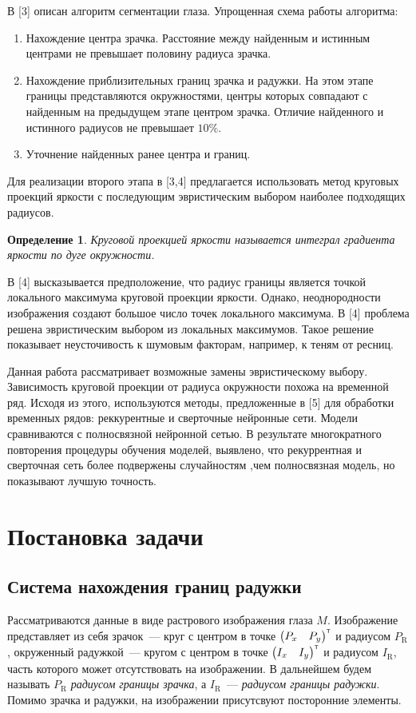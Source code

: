 \documentclass[12pt, twoside]{article}
\newtheorem{definition}{Определение}
\begin{document}
В [3] описан алгоритм сегментации глаза. Упрощенная схема работы алгоритма:
\begin{enumerate}
	\item Нахождение центра зрачка.
	 Расстояние между найденным и истинным центрами не превышает половину радиуса зрачка.
	\item Нахождение приблизительных границ зрачка и радужки.
	На этом этапе границы представляются окружностями, центры которых совпадают с найденным на предыдущем этапе центром зрачка. Отличие найденного и истинного радиусов не превышает $10\%$.
	
	\item Уточнение найденных ранее центра и границ.
\end{enumerate}
Для реализации второго этапа в [3,4] предлагается использовать метод круговых проекций яркости с последующим эвристическим выбором наиболее подходящих радиусов.
\begin{definition}\label{def:proj}
\emph{Круговой проекцией яркости} называется интеграл градиента яркости по дуге окружности.
\end{definition}
В [4] высказывается предположение, что радиус границы является точкой локального максимума круговой проекции яркости. Однако, неоднородности изображения создают большое число точек локального максимума. В [4] проблема решена эвристическим выбором из локальных максимумов. Такое решение показывает неусточивость к шумовым факторам, например, к теням от ресниц.

Данная работа рассматривает возможные замены эвристическому выбору. Зависимость круговой проекции от радиуса окружности похожа на временной ряд. Исходя из этого, используются методы, предложенные в [5] для обработки временных рядов: реккурентные и сверточные нейронные сети. Модели сравниваются с полносвязной нейронной сетью. В результате многократного повторения процедуры обучения моделей, выявлено, что рекуррентная и сверточная сеть более подвержены случайностям ,чем полносвязная модель, но показывают лучшую точность.

\section{Постановка задачи}
\subsection{Система нахождения границ радужки}

Рассматриваются данные в виде растрового изображения глаза $M$. Изображение представляет из себя зрачок~--- круг с центром в точке $\begin{pmatrix}P_x & P_y\end{pmatrix}^{\text{\tiny\sffamily\upshape\mdseries T}}$ и радиусом $P_\text{R}$, окруженный радужкой~--- кругом с центром в точке $\begin{pmatrix}I_x & I_y\end{pmatrix}^{\text{\tiny\sffamily\upshape\mdseries T}}$ и радиусом $I_\text{R}$, часть которого может отсутствовать на изображении. В дальнейшем будем называть $P_\text{R}$ \textit{радиусом границы зрачка}, а $I_\text{R}$~--- \textit{радиусом границы радужки}. Помимо зрачка и радужки, на изображении присутсвуют посторонние элементы.
\end{document}
